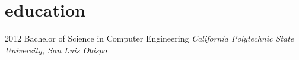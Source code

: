 \documentclass[]{friggeri-cv}
\begin{document}
\section{education}

\begin{entrylist}
  \entry
    {2012}
    {Bachelor of Science {\normalfont in Computer Engineering}}
    {}
    {\emph{California Polytechnic State University, San Luis Obispo}}
\end{entrylist}





\end{document}

